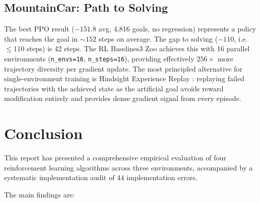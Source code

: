 \documentclass[a4paper,12pt]{article}
\begin{document}
\subsection{MountainCar: Path to Solving}

The best PPO result ($-151.8$ avg, 4,816 goals, no regression) represents a policy that reaches the goal in $\sim152$ steps on average. The gap to solving ($-110$, i.e.\ $\leq110$ steps) is 42 steps. The RL Baselines3 Zoo achieves this with 16 parallel environments (\texttt{n\_envs=16}, \texttt{n\_steps=16}), providing effectively $256\times$ more trajectory diversity per gradient update. The most principled alternative for single-environment training is Hindsight Experience Replay \cite{andrychowicz2017hindsight}: replaying failed trajectories with the achieved state as the artificial goal avoids reward modification entirely and provides dense gradient signal from every episode.

\section{Conclusion}
\label{sec:conclusion}

This report has presented a comprehensive empirical evaluation of four reinforcement learning algorithms across three environments, accompanied by a systematic implementation audit of 44 implementation errors.

The main findings are:
\end{document}
